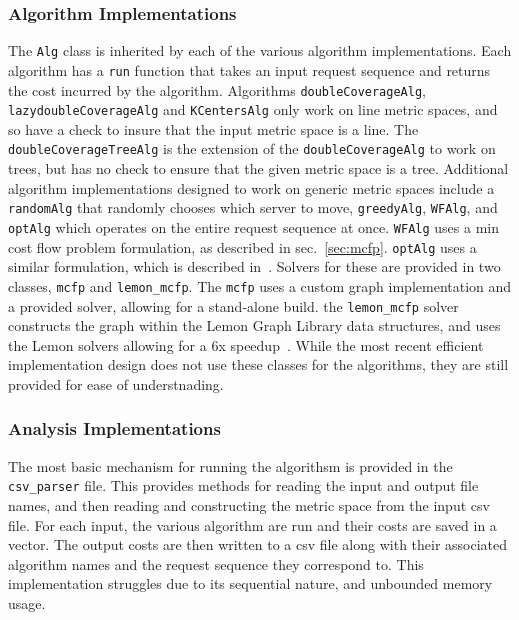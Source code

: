 \subsubsection*{Algorithm Implementations}

The \texttt{Alg} class is inherited by each of the various algorithm implementations. Each algorithm has a \texttt{run} function that takes an input request sequence and returns the cost incurred by the algorithm. Algorithms \texttt{doubleCoverageAlg}, \texttt{lazydoubleCoverageAlg} and \texttt{KCentersAlg} only work on line metric spaces, and so have a check to insure that the input metric space is a line. The \texttt{doubleCoverageTreeAlg} is the extension of the \texttt{doubleCoverageAlg} to work on trees, but has no check to ensure that the given metric space is a tree. Additional algorithm implementations designed to work on generic metric spaces include a \texttt{randomAlg} that randomly chooses which server to move, \texttt{greedyAlg}, \texttt{WFAlg}, and \texttt{optAlg} which operates on the entire request sequence at once. \texttt{WFAlg} uses a min cost flow problem formulation, as described in sec.~\ref{sec:mcfp}. \texttt{optAlg} uses a similar formulation, which is described in~\cite{mcfp2011}. Solvers for these are provided in two classes, \texttt{mcfp} and \texttt{lemon\_mcfp}. The \texttt{mcfp} uses a custom graph implementation and a provided solver, allowing for a stand-alone build. the \texttt{lemon\_mcfp} solver constructs the graph within the Lemon Graph Library data structures, and uses the Lemon solvers allowing for a 6x speedup~\cite{lemon}. While the most recent efficient implementation design does not use these classes for the algorithms, they are still provided for ease of understnading.

\subsubsection*{Analysis Implementations}

The most basic mechanism for running the algorithsm is provided in the \texttt{csv\_parser} file. This provides methods for reading the input and output file names, and then reading and constructing the metric space from the input csv file. For each input, the various algorithm are run and their costs are saved in a vector. The output costs are then written to a csv file along with their associated algorithm names and the request sequence they correspond to. This implementation struggles due to its sequential nature, and unbounded memory usage.

